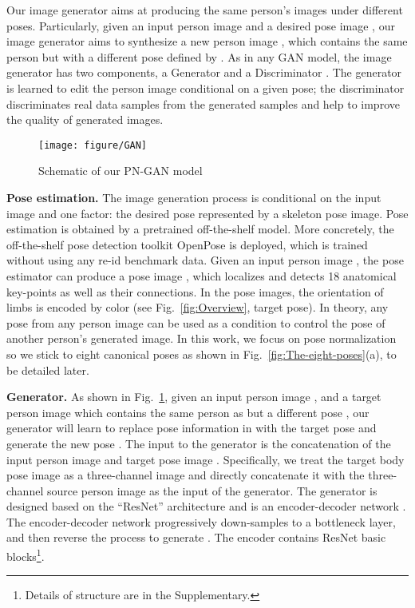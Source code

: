 \documentclass[10pt,letterpaper,twocolumn,10pt,letterpaper,twocolumn]{article}
\begin{document}
\noindent Our image generator aims at producing the same person's
images under different poses. Particularly, given an input person
image  and a desired pose image ,
our image generator aims to synthesize a new person image ,
which contains the same person but with a different pose defined by
. As in any GAN model, the image generator
has two components, a Generator  and a Discriminator .
The generator is learned to edit the person image conditional on a
given pose; the discriminator discriminates real data samples from
the generated samples and help to improve the quality of generated
images.

\begin{figure}
\begin{centering}
\texttt{[image: figure/GAN]}
\par\end{centering}
\caption{\label{fig:gan} Schematic of our PN-GAN model}
\end{figure}

\vspace{0.1in}

\noindent \textbf{Pose estimation.} The image generation process is
conditional on the input image and one  factor: the desired pose represented
by a skeleton pose image. Pose estimation is obtained by a pretrained
off-the-shelf model. More concretely, the off-the-shelf pose detection
toolkit \textendash{} OpenPose \cite{cao2017realtime} is deployed,
which is trained without using any re-id benchmark data. Given an
input person image , the pose estimator can produce
a pose image , which localizes and
detects 18 anatomical key-points as well as their connections. In
the pose images, the orientation of limbs is encoded by color (see
Fig.~\ref{fig:Overview}, target pose). In theory, any pose from
any person image can be used as a condition to control the pose of
another person's generated image. In this work, we focus on pose normalization
so we stick to eight canonical poses as shown in Fig.~\ref{fig:The-eight-poses}(a),
to be detailed later.

\vspace{0.1in}

\noindent \textbf{Generator.} As shown in Fig.~\ref{fig:gan}, given
an input person image , and a target person image
 which contains the same person as 
but a different pose , our generator
will learn to replace pose information in  with the
target pose  and generate the new pose
. The input to the generator is the concatenation
of the input person image  and target pose image
. Specifically, we treat the target
body pose image  as a three-channel
image and directly concatenate it with the three-channel source person
image as the input of the generator. The generator  is designed
based on the ``ResNet'' architecture and is an encoder-decoder network
\cite{hinton2006science}. The encoder-decoder network progressively
down-samples  to a bottleneck layer, and then reverse
the process to generate . The encoder contains  ResNet basic blocks\footnote{Details of structure are in the Supplementary.}. 
\end{document}

